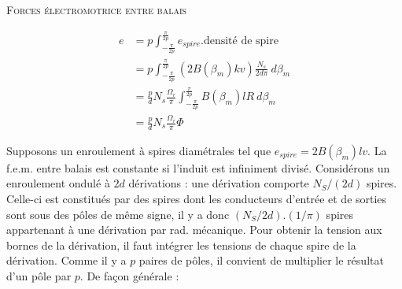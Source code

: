 		\textsc{Forces électromotrice entre balais}\ \\
		\begin{figure}
		\vspace{-2mm}
		\begin{equation}
		\begin{array}{ll}
		e &= \displaystyle p \int_{-\frac{\pi}{2p}}^{\frac{\pi}{2p}} 
		e_{spire}.\text{densité de spire}\\
		&= \displaystyle p \int_{-\frac{\pi}{2p}}^{\frac{\pi}{2p}} (
		2B(\beta_m)kv)\frac{N_s}{2d\pi}\ d\beta_m\\
		&= \displaystyle \frac{p}{d}N_s\frac{\Omega_r}{\pi} \int_{-
		\frac{\pi}{2p}}^{\frac{\pi}{2p}}B(\beta_m)lR\ d\beta_m\\
		&= \displaystyle\frac{p}{d}N_s\frac{\Omega_r}{\pi}\Phi
		\end{array}
		\end{equation}

		\end{figure}
		Supposons un enroulement à spires diamétrales tel que $e_{spire} = 
		2B(\beta_m)lv$. La f.e.m. entre balais est constante si l'induit 
		est infiniment divisé. Considérons un enroulement ondulé à $2d$ 
		dérivations : une dérivation comporte $N_S/(2d)$ spires. Celle-ci 
		est constitués par des spires dont les conducteurs d'entrée et 
		de sorties sont sous des pôles de même signe, il y a donc 
		$(N_S/2d).(1/\pi)$ spires appartenant à une dérivation par rad. 
		mécanique. Pour obtenir la tension aux bornes de la dérivation, 
		il faut intégrer les tensions de chaque spire de la dérivation. 
		Comme il y a $p$ paires de pôles, il convient de multiplier le 
		résultat d'un pôle par $p$. De façon générale :\\
		
		
